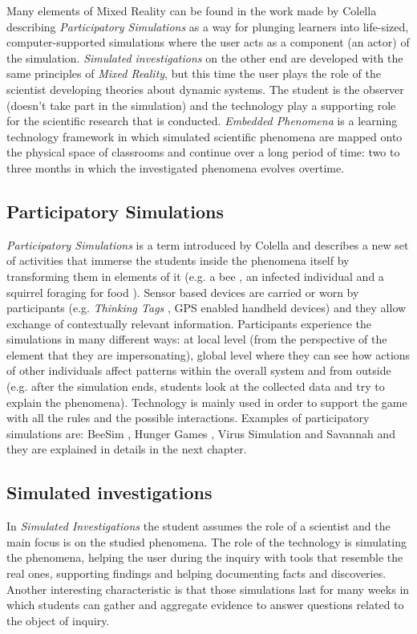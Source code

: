 Many elements of Mixed Reality can be found in the work made by Colella \cite{colella:virus} describing \textit{Participatory Simulations} as a way for plunging learners into life-sized, computer-supported simulations where the user acts as a component (an actor) of the simulation. \textit{Simulated investigations} on the other end are developed with the same principles of \textit{Mixed Reality}, but this time the user plays the role of the scientist developing theories about dynamic systems. The student is the observer (doesn't take part in the simulation) and the technology play a supporting role for the scientific research that is conducted. \textit{Embedded Phenomena} is a learning technology framework in which simulated scientific phenomena are mapped onto the physical space of classrooms \cite{moher:embedded} and continue over a long period of time: two to three months in which the investigated phenomena evolves overtime.

\subsection{Participatory Simulations}
\textit{Participatory Simulations} is a term introduced by Colella \cite{colella:virus} and describes a new set of activities that immerse the students inside the phenomena itself by transforming them in elements of it (e.g. a bee \cite{peppler:beesim}, an infected individual \cite{colella:virus} and a squirrel foraging for food \cite{gnoli:hunger_games}). Sensor based devices are carried or worn by participants (e.g. \textit{Thinking Tags} \cite{colella:virus}, GPS enabled handheld devices) and they allow exchange of contextually relevant information. Participants experience the simulations in many different ways: at local level (from the perspective of the element that they are impersonating), global level where they can see how actions of other individuals affect patterns within the overall system and from outside (e.g. after the simulation ends, students look at the collected data and try to explain the phenomena). Technology is mainly used in order to support the game with all the rules and the possible interactions. Examples of participatory simulations are: BeeSim \cite{peppler:beesim}, Hunger Games \cite{gnoli:hunger_games}, Virus Simulation \cite{colella:virus} and Savannah \cite{facer:savannah} and they are explained in details in the next chapter.

\subsection{Simulated investigations}
In \textit{Simulated Investigations} the student assumes the role of a scientist and the main focus is on the studied phenomena. The role of the technology is simulating the phenomena, helping the user during the inquiry with tools that resemble the real ones, supporting findings and helping documenting facts and discoveries. Another interesting characteristic is that those simulations last for many weeks in which students can gather and aggregate evidence to answer questions related to the object of inquiry.

